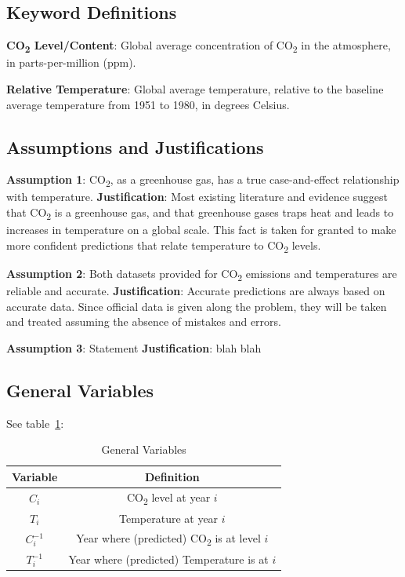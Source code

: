 \documentclass{mcmthesis}
\begin{document}
    \subsection{Keyword Definitions}
    \noindent\textbf{CO\textsubscript{2} Level/Content}: Global average concentration of CO\textsubscript{2} in the atmosphere, in parts-per-million (ppm).

    \noindent\textbf{Relative Temperature}: Global average temperature, relative to the baseline average temperature from 1951 to 1980, in degrees Celsius.


    \subsection{Assumptions and Justifications}
    \noindent\textbf{Assumption 1}: CO\textsubscript{2}, as a greenhouse gas, has a true case-and-effect relationship with temperature.
    \textbf{Justification}: Most existing literature and evidence suggest that CO\textsubscript{2} is a greenhouse gas, and that greenhouse gases traps heat and leads to increases in temperature on a global scale. This fact is taken for granted to make more confident predictions that relate temperature to CO\textsubscript{2} levels.

    \noindent\textbf{Assumption 2}: Both datasets provided for CO\textsubscript{2} emissions and temperatures are reliable and accurate.
    \textbf{Justification}: Accurate predictions are always based on accurate data. Since official data is given along the problem, they will be taken and treated assuming the absence of mistakes and errors.

    \noindent\textbf{Assumption 3}: Statement
    \textbf{Justification}: blah blah


    \subsection{General Variables}
    See table~\ref{tab:my_label}:
    \begin{table}[h!]
        \centering
        \begin{tabular}{cc}
            \toprule
            Variable & Definition      \\
            \midrule
            $C_i$      & CO\textsubscript{2} level at year $i$     \\
            $T_i$      & Temperature at year $i$     \\
            $C^{-1}_i$ & Year where (predicted) CO\textsubscript{2} is at level $i$ \\
            $T^{-1}_i$ & Year where (predicted) Temperature is at $i$ \\
            \bottomrule
        \end{tabular}
        \caption{General Variables}
        \label{tab:my_label}
    \end{table}
\end{document}
